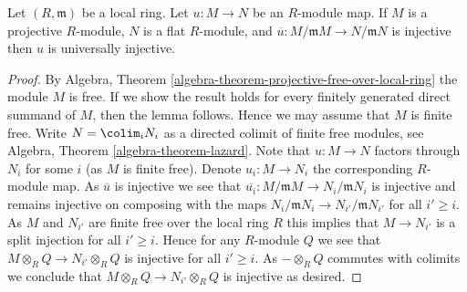 \begin{lemma}
\label{lemma-universally-injective-local}
Let $(R, \mathfrak m)$ be a local ring. Let $u : M \to N$ be an $R$-module map.
If $M$ is a projective $R$-module, $N$ is a flat $R$-module, and
$\overline{u} : M/\mathfrak mM \to N/\mathfrak mN$ is injective
then $u$ is universally injective.
\end{lemma}

\begin{proof}
By
Algebra, Theorem \ref{algebra-theorem-projective-free-over-local-ring}
the module $M$ is free. If we show the result holds for every finitely
generated direct summand of $M$, then the lemma follows. Hence we may
assume that $M$ is finite free. Write $N = \colim_i N_i$ as
a directed colimit of finite free modules, see
Algebra, Theorem \ref{algebra-theorem-lazard}.
Note that $u : M \to N$ factors through $N_i$ for some $i$ (as $M$ is finite
free). Denote $u_i : M \to N_i$ the corresponding $R$-module map.
As $\overline{u}$ is injective we see that
$\overline{u_i} : M/\mathfrak mM \to N_i/\mathfrak mN_i$ is
injective and remains injective on composing with the maps
$N_i/\mathfrak mN_i \to N_{i'}/\mathfrak mN_{i'}$ for all $i' \geq i$.
As $M$ and $N_{i'}$ are finite free over the local ring $R$ this implies
that $M \to N_{i'}$ is a split injection for all $i' \geq i$. Hence
for any $R$-module $Q$ we see that $M \otimes_R Q \to N_{i'} \otimes_R Q$
is injective for all $i' \geq i$. As $- \otimes_R Q$ commutes with
colimits we conclude that $M \otimes_R Q \to N_{i'} \otimes_R Q$
is injective as desired.
\end{proof}
